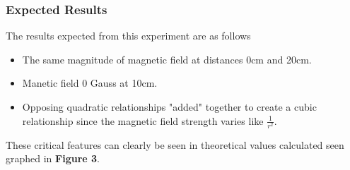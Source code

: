 \documentclass{article}
\begin{document}
   \subsubsection{Expected Results}
   The results expected from this experiment are as follows
   \begin{itemize}
       \item The same magnitude of magnetic field at distances 0cm and 20cm.
       \item Manetic field 0 Gauss at 10cm.
       \item Opposing quadratic relationships "added" together to create a cubic relationship since the magnetic field strength varies like \(\frac{1}{r^2}\).
   \end{itemize}
   These critical features can clearly be seen in theoretical values calculated seen graphed in \textbf{Figure 3}.
\end{document}
